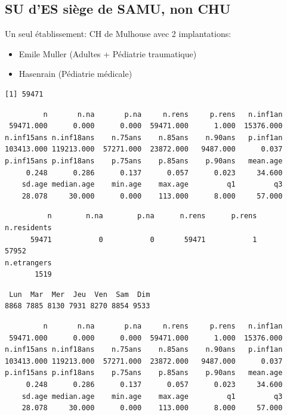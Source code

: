 \documentclass[]{article}
\begin{document}
\subsection{SU d'ES siège de SAMU, non
CHU}\label{su-des-siege-de-samu-non-chu}

Un seul établissement: CH de Mulhouse avec 2 implantations:

\begin{itemize}
\itemsep1pt\parskip0pt
\item
  Emile Muller (Adultes + Pédiatrie traumatique)
\item
  Hasenrain (Pédiatrie médicale)
\end{itemize}

\begin{verbatim}
[1] 59471
\end{verbatim}

\begin{verbatim}
         n       n.na       p.na     n.rens     p.rens   n.inf1an 
 59471.000      0.000      0.000  59471.000      1.000  15376.000 
n.inf15ans n.inf18ans    n.75ans    n.85ans    n.90ans   p.inf1an 
103413.000 119213.000  57271.000  23872.000   9487.000      0.037 
p.inf15ans p.inf18ans    p.75ans    p.85ans    p.90ans   mean.age 
     0.248      0.286      0.137      0.057      0.023     34.600 
    sd.age median.age    min.age    max.age         q1         q3 
    28.078     30.000      0.000    113.000      8.000     57.000 
\end{verbatim}

\begin{verbatim}
          n        n.na        p.na      n.rens      p.rens n.residents 
      59471           0           0       59471           1       57952 
n.etrangers 
       1519 
\end{verbatim}

\begin{verbatim}
 Lun  Mar  Mer  Jeu  Ven  Sam  Dim 
8868 7885 8130 7931 8270 8854 9533 
\end{verbatim}

\begin{verbatim}
         n       n.na       p.na     n.rens     p.rens   n.inf1an 
 59471.000      0.000      0.000  59471.000      1.000  15376.000 
n.inf15ans n.inf18ans    n.75ans    n.85ans    n.90ans   p.inf1an 
103413.000 119213.000  57271.000  23872.000   9487.000      0.037 
p.inf15ans p.inf18ans    p.75ans    p.85ans    p.90ans   mean.age 
     0.248      0.286      0.137      0.057      0.023     34.600 
    sd.age median.age    min.age    max.age         q1         q3 
    28.078     30.000      0.000    113.000      8.000     57.000 
\end{verbatim}
\end{document}
